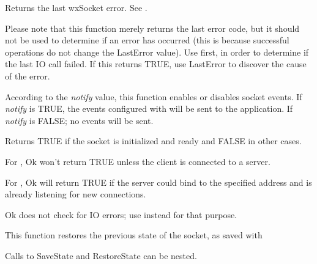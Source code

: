 %
%
\label{wxsocketbaselasterror}


Returns the last wxSocket error. See .

Please note that this function merely returns the last error code,
but it should not be used to determine if an error has occurred (this
is because successful operations do not change the LastError value).
Use  first, in order to determine
if the last IO call failed. If this returns TRUE, use LastError
to discover the cause of the error.

%
%
\label{wxsocketbasenotify}


According to the {\it notify} value, this function enables
or disables socket events. If {\it notify} is TRUE, the events
configured with  will
be sent to the application. If {\it notify} is FALSE; no events
will be sent.

% 
%
\label{wxsocketbaseok}


Returns TRUE if the socket is initialized and ready and FALSE in other
cases.


For , Ok won't return TRUE unless
the client is connected to a server.

For , Ok will return TRUE if the
server could bind to the specified address and is already listening for
new connections.

Ok does not check for IO errors;
use  instead for that purpose.

%
%
\label{wxsocketbaserestorestate}


This function restores the previous state of the socket, as saved
with 

Calls to SaveState and RestoreState can be nested.


